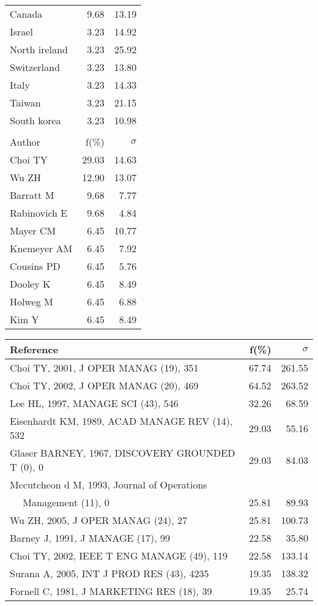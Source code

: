 \documentclass[a4paper,11pt]{report}
\begin{document}
\begin{landscape}
\begin{table}[!ht]
{\begin{tabular}{|l r r|}
Canada & 9.68 & 13.19\\
Israel & 3.23 & 14.92\\
North ireland & 3.23 & 25.92\\
Switzerland & 3.23 & 13.80\\
Italy & 3.23 & 14.33\\
Taiwan & 3.23 & 21.15\\
South korea & 3.23 & 10.98\\
 &  & \\
\hline
\hline
Author & f(\%) & $\sigma$\\
\hline
Choi TY & 29.03 & 14.63\\
Wu ZH & 12.90 & 13.07\\
Barratt M & 9.68 & 7.77\\
Rabinovich E & 9.68 & 4.84\\
Mayer CM & 6.45 & 10.77\\
Knemeyer AM & 6.45 & 7.92\\
Cousins PD & 6.45 & 5.76\\
Dooley K & 6.45 & 8.49\\
Holweg M & 6.45 & 6.88\\
Kim Y & 6.45 & 8.49\\
\hline
\end{tabular}
}
{\scriptsize\begin{tabular}{|l r r|}
\hline
Reference & f(\%) & $\sigma$\\
\hline
Choi TY, 2001, J OPER MANAG (19), 351 & 67.74 & 261.55\\
Choi TY, 2002, J OPER MANAG (20), 469 & 64.52 & 263.52\\
Lee HL, 1997, MANAGE SCI (43), 546 & 32.26 & 68.59\\
Eisenhardt KM, 1989, ACAD MANAGE REV (14), 532 & 29.03 & 55.16\\
Glaser BARNEY, 1967, DISCOVERY GROUNDED T (0), 0 & 29.03 & 84.03\\
Mccutcheon d M, 1993, Journal of Operations &  & \\
$\quad$ Management (11), 0 & 25.81 & 89.93\\
Wu ZH, 2005, J OPER MANAG (24), 27 & 25.81 & 100.73\\
Barney J, 1991, J MANAGE (17), 99 & 22.58 & 35.80\\
Choi TY, 2002, IEEE T ENG MANAGE (49), 119 & 22.58 & 133.14\\
Surana A, 2005, INT J PROD RES (43), 4235 & 19.35 & 138.32\\
Fornell C, 1981, J MARKETING RES (18), 39 & 19.35 & 25.74\\

\end{tabular}}
\end{table}
\end{landscape}
\end{document}
